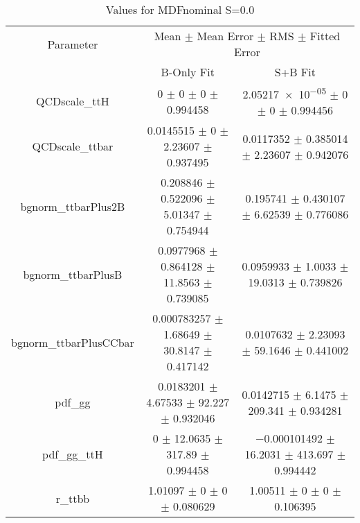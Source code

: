 \begin{table}
\centering
\caption{Values for MDFnominal S=0.0}
\begin{tabular}{ccc}
\toprule
Parameter & \multicolumn{2}{c}{Mean $\pm$ Mean Error $\pm$ RMS $\pm$ Fitted Error}\\
 & B-Only Fit & S+B Fit\\
\midrule
QCDscale\_ttH & \num{0} $\pm$ \num{0} $\pm$ \num{0} $\pm$ \num{0.994458} & \num{2.05217e-05} $\pm$ \num{0} $\pm$ \num{0} $\pm$ \num{0.994456}\\
QCDscale\_ttbar & \num{0.0145515} $\pm$ \num{0} $\pm$ \num{2.23607} $\pm$ \num{0.937495} & \num{0.0117352} $\pm$ \num{0.385014} $\pm$ \num{2.23607} $\pm$ \num{0.942076}\\
bgnorm\_ttbarPlus2B & \num{0.208846} $\pm$ \num{0.522096} $\pm$ \num{5.01347} $\pm$ \num{0.754944} & \num{0.195741} $\pm$ \num{0.430107} $\pm$ \num{6.62539} $\pm$ \num{0.776086}\\
bgnorm\_ttbarPlusB & \num{0.0977968} $\pm$ \num{0.864128} $\pm$ \num{11.8563} $\pm$ \num{0.739085} & \num{0.0959933} $\pm$ \num{1.0033} $\pm$ \num{19.0313} $\pm$ \num{0.739826}\\
bgnorm\_ttbarPlusCCbar & \num{0.000783257} $\pm$ \num{1.68649} $\pm$ \num{30.8147} $\pm$ \num{0.417142} & \num{0.0107632} $\pm$ \num{2.23093} $\pm$ \num{59.1646} $\pm$ \num{0.441002}\\
pdf\_gg & \num{0.0183201} $\pm$ \num{4.67533} $\pm$ \num{92.227} $\pm$ \num{0.932046} & \num{0.0142715} $\pm$ \num{6.1475} $\pm$ \num{209.341} $\pm$ \num{0.934281}\\
pdf\_gg\_ttH & \num{0} $\pm$ \num{12.0635} $\pm$ \num{317.89} $\pm$ \num{0.994458} & \num{-0.000101492} $\pm$ \num{16.2031} $\pm$ \num{413.697} $\pm$ \num{0.994442}\\
r\_ttbb & \num{1.01097} $\pm$ \num{0} $\pm$ \num{0} $\pm$ \num{0.080629} & \num{1.00511} $\pm$ \num{0} $\pm$ \num{0} $\pm$ \num{0.106395}\\
\bottomrule
\end{tabular}
\end{table}
